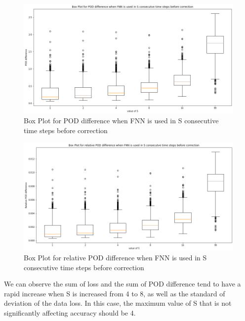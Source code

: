 \begin{figure}[H]
    \caption{Box Plot for POD difference when FNN is used in S consecutive time steps before correction}
    \includegraphics[scale=0.4]{figures/mantle_convection_images/further_testings/POD_boxplot.png}
\end{figure}

\begin{figure}[H]
    \caption{Box Plot for relative POD difference when FNN is used in S consecutive time steps before correction}
    \includegraphics[scale=0.4]{figures/mantle_convection_images/further_testings/Relative_POD_boxplot.png}
\end{figure}

We can observe the sum of loss and the sum of POD difference tend to have a rapid increase when S is increased from 4 to 8, as well as the standard of deviation of the data loss. In this case, the maximum value of S that is not significantly affecting accuracy should be 4.




